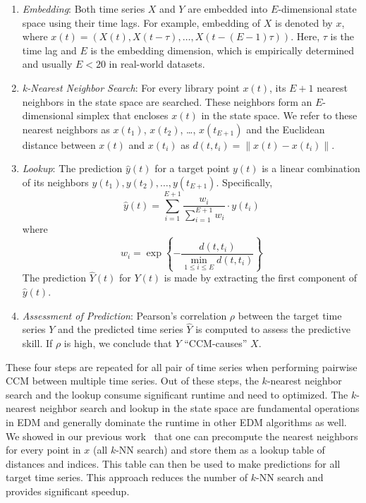 \documentclass{acmart}
\begin{document}
\begin{enumerate}
    \item \textit{Embedding}: Both time series $X$ and $Y$ are embedded into
        $E$-dimensional state space using their time lags. For example, embedding
        of $X$ is denoted by $x$, where $x(t)=(X(t), X(t-\tau),
        \dots, X(t-(E-1) \tau))$. Here, $\tau$ is the time lag and $E$ is 
        the embedding dimension, which is
        empirically determined and usually $E<20$ in real-world datasets.
    \item \textit{k-Nearest Neighbor Search}: For every library point $x(t)$,
         its $E+1$ nearest neighbors in the state space are searched. These
         neighbors form an $E$-dimensional simplex that encloses $x(t)$ in the
         state space. We refer to these nearest neighbors as $x(t_1)$, $x(t_2)$,
         \dots, $x(t_{E+1})$ and the Euclidean distance between $x(t)$ and
         $x(t_i)$ as $d(t, t_i) =\lVert x(t) - x(t_i)
        \rVert$.
    \item \textit{Lookup}: The prediction $\hat{y}(t)$ for a target point $y(t)$ is a
        linear combination of its neighbors $y(t_1), y(t_2), \dots, y(t_{E+1})$.
        Specifically,
        \begin{equation*}
            \hat{y}(t) = \sum^{E+1}_{i=1} \frac{w_i}{\sum^{E+1}_{i=1}{w_i}} \cdot y(t_i)
        \end{equation*}
        where
        \begin{equation*}
            w_i = \exp\left\{ -\frac{d(t, t_i)}{\min\limits_{1\leq i \leq E}{d(t, t_i)}}\right\}
        \end{equation*}
        The prediction $\hat{Y}(t)$ for $Y(t)$ is made by extracting the first
        component of $\hat{y}(t)$.
    \item \textit{Assessment of Prediction}: Pearson's correlation $\rho$
        between the target time series $Y$ and the predicted time series $\hat{Y}$
        is computed to assess the predictive skill.
        If $\rho$ is high, we conclude that $Y$ ``CCM-causes'' $X$.
\end{enumerate}

These four steps are repeated for all pair of time series when performing pairwise
CCM between multiple time series. Out of these steps, the $k$-nearest neighbor
search and the lookup consume significant runtime and need to optimized. 
The $k$-nearest neighbor search and lookup in the state space are fundamental operations in EDM and generally dominate the runtime in other EDM algorithms as well.
We showed in our previous work~\cite{mpedm} that one can precompute the nearest
neighbors for every point in $x$ (all $k$-NN search) and store them as a lookup
table of distances and indices. This table can then be used to make
predictions for all target time series. This approach reduces the number of
$k$-NN search and provides significant speedup.
\end{document}
